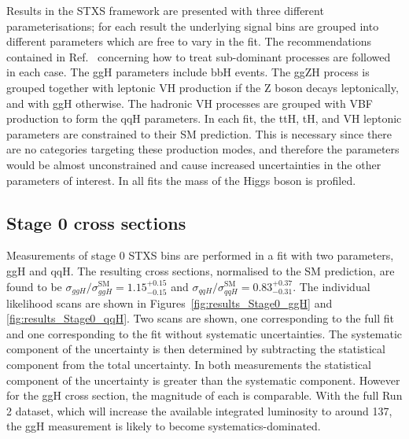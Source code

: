 Results in the STXS framework are presented with three different parameterisations;
for each result the underlying signal bins 
are grouped into different parameters which are free to vary in the fit.
The recommendations contained in Ref.~\cite{YR4} 
concerning how to treat sub-dominant processes are followed in each case.
The ggH parameters include bbH events.
The ggZH process is grouped together with leptonic VH production if the Z boson decays leptonically, 
and with ggH otherwise.
The hadronic VH processes are grouped with VBF production to form the qqH parameters.
In each fit, the ttH, tH, and VH leptonic parameters are constrained to their SM prediction. 
This is necessary since there are no categories targeting these production modes, 
and therefore the parameters would be almost unconstrained 
and cause increased uncertainties in the other parameters of interest.
In all fits the mass of the Higgs boson is profiled.

\subsection{Stage 0 cross sections}
Measurements of stage 0 STXS bins are performed in a fit with two parameters, ggH and qqH.
The resulting cross sections, normalised to the SM prediction, are found to be 
$\sigma_{ggH}/\sigma_{ggH}^{\textrm{SM}} = 1.15_{-0.15}^{+0.15}$ 
and $\sigma_{qqH}/\sigma_{qqH}^{\textrm{SM}} = 0.83_{-0.31}^{+0.37}$.
The individual likelihood scans are shown 
in Figures~\ref{fig:results_Stage0_ggH} and \ref{fig:results_Stage0_qqH}.
Two scans are shown, one corresponding to the full fit
and one corresponding to the fit without systematic uncertainties.
The systematic component of the uncertainty is then determined 
by subtracting the statistical component from the total uncertainty.
In both measurements the statistical component of the uncertainty 
is greater than the systematic component.
However for the ggH cross section, the magnitude of each is comparable.
With the full Run 2 dataset, 
which will increase the available integrated luminosity to around \SI{137}{\fbinv}, 
the ggH measurement is likely to become systematics-dominated.


